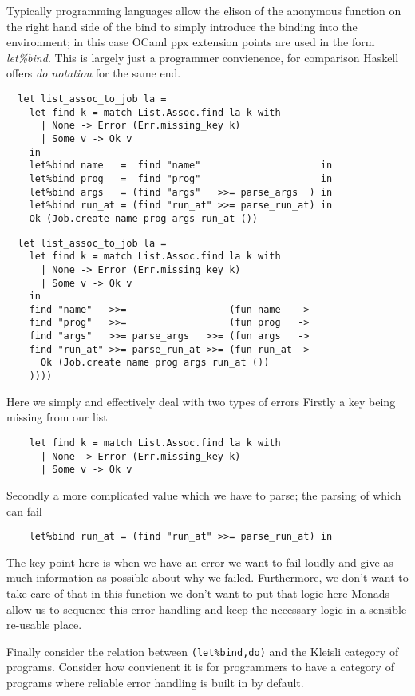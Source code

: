 \documentclass[a4paper,10pt]{article}
\theoremstyle{definition}
\begin{document}
Typically programming languages allow the elison of the anonymous function on the right hand side
of the bind to simply introduce the binding into the environment;
in this case OCaml ppx extension points are used in the form \textit{let\%bind}.
This is largely just a programmer convienence,
for comparison Haskell offers \textit{do notation} for the same end.

\begin{verbatim}
  let list_assoc_to_job la =
    let find k = match List.Assoc.find la k with
      | None -> Error (Err.missing_key k)
      | Some v -> Ok v
    in
    let%bind name   =  find "name"                     in
    let%bind prog   =  find "prog"                     in
    let%bind args   = (find "args"   >>= parse_args  ) in
    let%bind run_at = (find "run_at" >>= parse_run_at) in
    Ok (Job.create name prog args run_at ())
\end{verbatim}

\begin{verbatim}
  let list_assoc_to_job la =
    let find k = match List.Assoc.find la k with
      | None -> Error (Err.missing_key k)
      | Some v -> Ok v
    in
    find "name"   >>=                  (fun name   ->
    find "prog"   >>=                  (fun prog   ->
    find "args"   >>= parse_args   >>= (fun args   ->
    find "run_at" >>= parse_run_at >>= (fun run_at ->
      Ok (Job.create name prog args run_at ())
    ))))
\end{verbatim}



Here we simply and effectively deal with two types of errors
Firstly a key being missing from our list
\begin{verbatim}
    let find k = match List.Assoc.find la k with
      | None -> Error (Err.missing_key k)
      | Some v -> Ok v
\end{verbatim}
Secondly a more complicated value which we have to parse;
the parsing of which can fail
\begin{verbatim}
    let%bind run_at = (find "run_at" >>= parse_run_at) in
\end{verbatim}
The key point here is when we have an error we want to fail
loudly and give as much information as possible about why we failed.
Furthermore, we don't want to take care of that in this function
we don't want to put that logic here
Monads allow us to sequence this error handling
and keep the necessary logic in a sensible re-usable place.

Finally consider the relation between
\texttt{(let\%bind,do)} and the Kleisli category of programs.
Consider how convienent it is for programmers to have a category
of programs where reliable error handling is built in by default.
\end{document}
